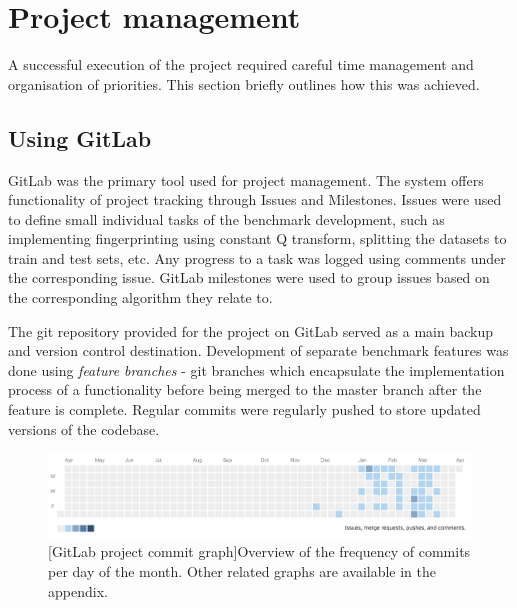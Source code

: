 
\chapter{Project management}
\label{chap:management}
\ifpdf
    \graphicspath{{Algorithms/Figures/PNG/}{EvaluationTask/Figures/PDF/}{Algorithms/Figures/}}
\else
    \graphicspath{{Algorithms/Figures/EPS/}{EvaluationTask/Figures/}}
\fi



A successful execution of the project required careful time management and
organisation of priorities. This section briefly outlines how this was achieved.

\section{Using GitLab} 
\label{sec:gitlab}
GitLab was the primary tool used for project management. The system offers
functionality of project tracking through Issues and Milestones. Issues were
used to define small individual tasks of the benchmark development, such as
implementing fingerprinting using constant Q transform, splitting the datasets
to train and test sets, etc. Any progress to a task was logged using comments
under the corresponding issue. GitLab milestones were used to group issues
based on the corresponding algorithm they relate to.

The git repository provided for the project on GitLab served as a main backup
and version control destination. Development of separate benchmark features was
done using \textit{feature branches} - git branches which encapsulate the
implementation process of a functionality before being merged to the master
branch after the feature is complete. Regular commits were regularly pushed to
store updated versions of the codebase. 

\begin{figure}[H]
   \centering
   \includegraphics[width=\textwidth]{ProjectManagement/commitgraph.png}
   [GitLab project commit graph]{Overview of the frequency of commits per day of the month. Other related graphs are available in the appendix.}
   \label{fig:commitgraph}
\end{figure}

